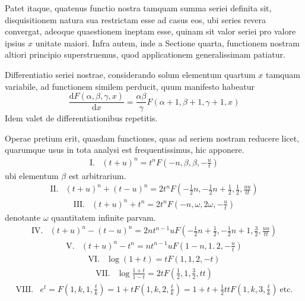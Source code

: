 Patet itaque, quatenus functio nostra tamquam summa seriei definita sit,
disquisitionem natura sua restrictam esse ad casus eos, ubi series revera convergat, adeoque quaestionem ineptam esse, quinam sit valor seriei pro valore ipsius
$x$ unitate maiori. Infra autem, inde a Sectione quarta, functionem nostram altiori principio superstruemus, quod applicationem generalissimam patiatur.

Differentiatio seriei nostrae, considerando solum elementum quartum $x$
tamquam variabile, ad functionem similem perducit, quum manifesto habeatur
\[
\frac{\mathrm{d}F(\alpha,\beta,\gamma,x)}{\mathrm{d}x}
=\frac{\alpha\beta}{\gamma}F(\alpha+1,\beta+1,\gamma+1,x)
\]
Idem valet de differentiationibus repetitis.

Operae pretium erit, quasdam functiones, quas ad seriem nostram reducere
licet, quarumque usus in tota analysi est frequentissimus, hic apponere.
\[
\begin{array}{rl}
\mathrm{I.}&(t+u)^n=t^nF(-n,\beta,\beta,-\frac{u}{t})
\end{array}
\]
ubi elementum $\beta$ est arbitrarium.
\[
\begin{array}{rl}
\mathrm{II.}&(t+u)^n+(t-u)^n=2t^nF(-\frac{1}{2}n,-\frac{1}{2}n+\frac{1}{2},\frac{1}{2},\frac{uu}{tt})
\end{array}
\]
\[
\begin{array}{rl}
\mathrm{III.}&(t+u)^n+t^n=2t^nF(-n,\omega,2\omega,-\frac{u}{t})
\end{array}
\]
denotante $\omega$ quantitatem infinite parvam.
\[
\begin{array}{rl}
\mathrm{IV.}&(t+u)^n-(t-u)^n=2nt^{n-1}uF(-\frac{1}{2}n+\frac{1}{2},-\frac{1}{2}n+1,\frac{3}{2},\frac{uu}{tt})
\end{array}
\]
\[
\begin{array}{rl}
\mathrm{V.}&(t+u)^n-t^n=nt^{n-1}uF(1-n,1.\ 2,-\frac{u}{t})
\end{array}
\]
\[
\begin{array}{rl}
\mathrm{VI.}&\log(1+t)=tF(1,1,2,-t)
\end{array}
\]
\[
\begin{array}{rl}
\mathrm{VII.}&\log\frac{1+t}{1-t}=2tF(\frac{1}{2},1,\frac{3}{2},tt)
\end{array}
\]
\[
\begin{array}{rl}
\mathrm{VIII.}&e^t=F(1,k,1,\frac{t}{k})=1+tF(1,k,2,\frac{t}{k})=1+t+\frac{1}{2}ttF(1,k,3,\frac{t}{k})\ \mbox{etc.}
\end{array}
\]
